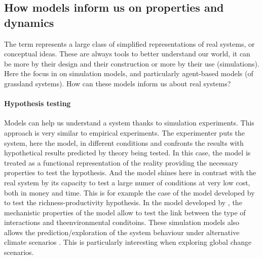 %



\subsection{How models inform us on properties and dynamics}

The term  represents a large class of simplified representations of real systems, or conceptual ideas. These are always tools to better understand our world, it can be more by their design and their construction or more by their use (simulations). Here the focus in on simulation models, and particularly agent-based models (of grassland systems). How can these models inform us about real systems?

\paragraph{Hypothesis testing}

Models can help us understand a system thanks to simulation experiments. This approach is very similar to empirical experiments. The experimenter puts the system, here the model, in different conditions and confronts the results with hypothetical results predicted by theory being tested. In this case, the model is treated as a functional representation of the reality providing the necessary properties to test the hypothesis. And the model shines here in contrast with the real system by its capacity to test a large numer of conditions at very low cost, both in money and time. This is for example the case of the model developed by \citet{taubert_modelling_2014} to test the richness-productivity hypothesis. In the model developed by \citet{droz_model_2013}, the mechanistic properties of the model allow to test the link between the type of interactions and theenvironmental conditoins. These simulation models also allows the prediction/exploration of the system behaviour under alternative climate scenarios \parencite{rodriguez_lingra-cc:_1999, scheiter_impacts_2009}. This is particularly interesting when exploring global change scenarios.

